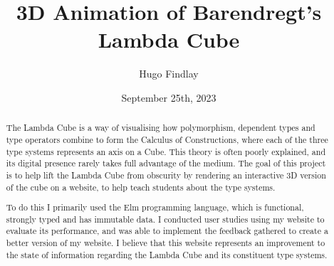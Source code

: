 \documentclass{l4proj}
\begin{document}
\title{3D Animation of Barendregt's Lambda Cube}
\author{Hugo Findlay}
\date{September 25th, 2023}

\maketitle

\begin{abstract}
    The Lambda Cube is a way of visualising how polymorphism, dependent types and type operators combine to form the Calculus of Constructions, where each of the three type systems represents an axis on a Cube.  This theory is often poorly explained, and its digital presence rarely takes full advantage of the medium.  The goal of this project is to help lift the Lambda Cube from obscurity by rendering an interactive 3D version of the cube on a website, to help teach students about the type systems.

    To do this I primarily used the Elm programming language, which is functional, strongly typed and has immutable data.  I conducted user studies using my website to evaluate its performance, and was able to implement the feedback gathered to create a better version of my website.  I believe that this website represents an improvement to the state of information regarding the Lambda Cube and its constituent type systems.
    
\end{abstract}


%
%
\def\consentname {Hugo Findlay} %
\def\consentdate {14 February 2024} %
%
\educationalconsent


\tableofcontents
\end{document}
